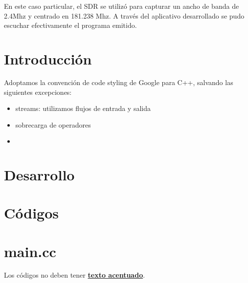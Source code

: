 \documentclass[10pt,a4paper]{article}
\begin{document}
En este caso particular, el SDR se utilizó para capturar un ancho
de banda de 2.4Mhz y centrado en 181.238 Mhz. A través del aplicativo
desarrollado se pudo escuchar efectivamente el programa emitido.


\section{Introducción}
Adoptamos la convención de code styling de Google para C++, salvando las siguientes excepciones:\\
\begin{itemize}
\item streams: utilizamos flujos de entrada y salida
\item sobrecarga de operadores
\item 

\end{itemize}
\section{Desarrollo}
\section{Códigos}
\section*{main.cc}
Los códigos no deben tener \textbf{\underline{texto acentuado}}.

\end{document}
